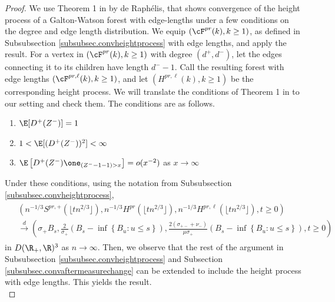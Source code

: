 \begin{proof}
We use Theorem 1 in \cite{deraphelisScalingLimitMultitype2017} by de Raphélis, that shows convergence of the height process of a Galton-Watson forest with edge-lengths under a few conditions on the degree and edge length distribution. We equip $(\cF^{pr}(k),k\geq 1)$, as defined in Subsubsection \ref{subsubsec.convheightprocess} with edge lengths, and apply the result. For a vertex in $(\cF^{pr}(k),k\geq 1)$ with degree $(d^+,d^-)$, let the edges connecting it to its children have length $d^--1$. Call the resulting forest with edge lengths $(\cF^{pr,\ell}(k),k\geq 1)$, and let $(H^{pr,\ell}(k),k\geq 1)$ be the corresponding height process.   We will translate the conditions of Theorem 1 in \cite{deraphelisScalingLimitMultitype2017} to our setting and check them. The conditions are as follows.
\begin{enumerate}
    \item $\E[D^+(Z^-)]=1$
    \item $1<\E[(D^+(Z^-))^2]<\infty$
    \item $\E\left[D^+(Z^-)\one_{(Z^--1-1)>x}\right]=o(x^{-2})$ as $x\to \infty$
\end{enumerate}
Under these conditions, using the notation from Subsubsection \ref{subsubsec.convheightprocess},
\begin{align}\begin{split}\label{eq.convmodifiedheightprocess}
&\left(n^{-1/3}S^{pr,+}\left(\lfloor t n^{2/3}\rfloor \right),n^{-1/3}H^{pr}\left(\lfloor t n^{2/3}\rfloor \right), n^{-1/3}H^{pr,\ell}\left(\lfloor t n^{2/3}\rfloor \right),t\geq 0\right)\\
&\overset{d}{\to}\left(\sigma_+ B_s, \frac{2}{\sigma_+}\left(B_s-\inf\left\{B_u:u\leq s\right\}\right), \frac{2(\sigma_{+-}+\nu_-)}{\mu\sigma_+}\left(B_s-\inf\left\{B_u:u\leq s\right\}\right),t\geq 0\right)
\end{split}\end{align}
in $D(\R_+,\R)^3$ as $n\to \infty$. 
Then, we observe that the rest of the argument in Subsubsection \ref{subsubsec.convheightprocess} and Subsection \ref{subsubsec.convaftermeasurechange} can be extended to include the height process with edge lengths. This yields the result.\\

\end{proof}
